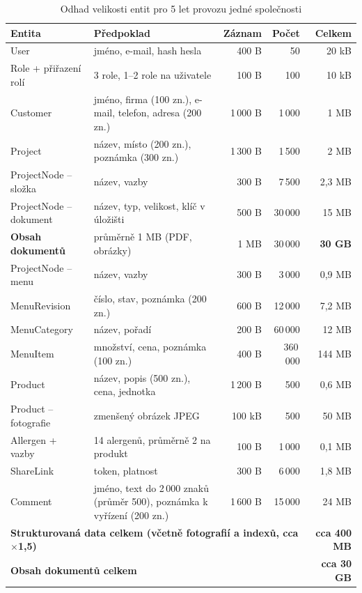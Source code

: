 \begin{table}[H]
\centering
\small
\begin{tabularx}{\textwidth}{lXrrr}
\toprule
\textbf{Entita} & \textbf{Předpoklad} & \textbf{Záznam} & \textbf{Počet} & \textbf{Celkem} \\
\midrule
User & jméno, e-mail, hash hesla & 400 B & 50 & 20 kB \\
Role + přiřazení rolí & 3 role, 1--2 role na uživatele & 100 B & 100 & 10 kB \\
Customer & jméno, firma (100 zn.), e-mail, telefon, adresa (200 zn.) & 1\,000 B & 1\,000 & 1 MB \\
Project & název, místo (200 zn.), poznámka (300 zn.) & 1\,300 B & 1\,500 & 2 MB \\
ProjectNode -- složka & název, vazby & 300 B & 7\,500 & 2,3 MB \\
ProjectNode -- dokument & název, typ, velikost, klíč v úložišti & 500 B & 30\,000 & 15 MB \\
\textbf{Obsah dokumentů} & průměrně 1 MB (PDF, obrázky) & 1 MB & 30\,000 & \textbf{30 GB} \\
ProjectNode -- menu & název, vazby & 300 B & 3\,000 & 0,9 MB \\
MenuRevision & číslo, stav, poznámka (200 zn.) & 600 B & 12\,000 & 7,2 MB \\
MenuCategory & název, pořadí & 200 B & 60\,000 & 12 MB \\
MenuItem & množství, cena, poznámka (100 zn.) & 400 B & 360\,000 & 144 MB \\
Product & název, popis (500 zn.), cena, jednotka & 1\,200 B & 500 & 0,6 MB \\
Product -- fotografie & zmenšený obrázek JPEG & 100 kB & 500 & 50 MB \\
Allergen + vazby & 14 alergenů, průměrně 2 na produkt & 100 B & 1\,000 & 0,1 MB \\
ShareLink & token, platnost & 300 B & 6\,000 & 1,8 MB \\
Comment & jméno, text do 2\,000 znaků (průměr 500), poznámka k vyřízení (200 zn.) & 1\,600 B & 15\,000 & 24 MB \\
\midrule
\multicolumn{4}{l}{\textbf{Strukturovaná data celkem (včetně fotografií a indexů, cca $\times$1,5)}} & \textbf{cca 400 MB} \\
\multicolumn{4}{l}{\textbf{Obsah dokumentů celkem}} & \textbf{cca 30 GB} \\
\bottomrule
\end{tabularx}
\caption{Odhad velikosti entit pro 5 let provozu jedné společnosti}
\end{table}

